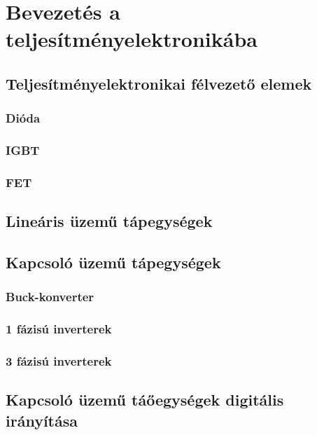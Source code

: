 \section{Bevezetés a teljesítményelektronikába}
\vspace{5cm}
\subsection{Teljesítményelektronikai félvezető elemek}
\subsubsection{Dióda}
\subsubsection{IGBT}
\subsubsection{FET}

\subsection{Lineáris üzemű tápegységek}


\subsection{Kapcsoló üzemű tápegységek}
\subsubsection{Buck-konverter}
\subsubsection{1 fázisú inverterek}
\subsubsection{3 fázisú inverterek}

\subsection{Kapcsoló üzemű táőegységek digitális irányítása}






















\vspace{-1.5mm}
\newpage